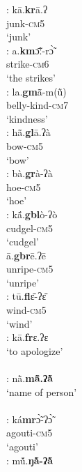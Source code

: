 \documentclass[output=paper]{langscibook}
\begin{document}
\begin{exe}
\begin{multicols}{2}
\begin{xlisti}
        \ex  \glll [kr]:     kā.\textbf{kr}ā.ʔ\\
            {}  junk-\textsc{cm5}\\
            {}  `junk'\\
        \ex \glll [km]: a.\textbf{km}ɔ̃̄ː-rɔ̃̀\\
            {}  strike-\textsc{cm6} \\
            {}  {`the strikes'}\\
        \ex \glll [gm]:    la.\textbf{gm}ã̄-m(ũ̀)  \\
            {} belly-kind-\textsc{cm}7\\
            {}   `kindness'\\
        \ex \glll [gl]:   hã̄.\textbf{gl}ā.ʔà \\
            {} bow-\textsc{cm}5 \\
            {} `bow'\\
        \ex \glll [gr]:    bà.\textbf{gr}à-ʔà\\
            {}  hoe-\textsc{cm5} \\
            {}  `hoe'\\
        \ex \glll [gbl]:  kã́.\textbf{gbl}ò-ʔò\\
            {} cudgel-\textsc{cm}5 \\
            {} ‘cudgel’\\
        \ex \glll [gbr]    ā.\textbf{gbr}ē.ʔē\\
            {}   unripe-\textsc{cm5}\\
            {}  `unripe'\\
        \ex \glll [fl]:    tū.\textbf{fl}ɛ̄-ʔɛ̄ \\
            {}  wind-\textsc{cm}5\\
            {}  `wind'\\
        \ex \glll [fr]:      kā.\textbf{fr}ɛ.ʔɛ\\
            {}  {`to apologize'}\\
            {}  {}\\
        \ex \glll [ml]:  nã̀.\textbf{mã̄.ʔã̀ ~}\\
            {} {`name of person'}\\
            {} {}\\
        \ex \glll [mr]:     ká\textbf{mr}ɔ̃̀-ʔɔ̃̀ \\
            {}   agouti-\textsc{cm}5\\
            {}   `agouti'\\
        \ex \glll [ŋl]:    mṹ.\textbf{ŋã̀-ʔã̀ }\\

\end{xlisti}
\end{multicols}
\end{exe}
\end{document}
